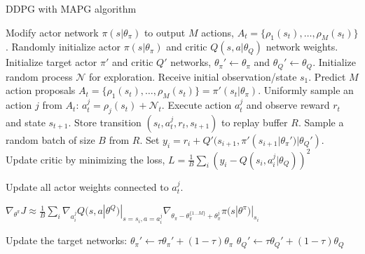 \begin{algorithm}[h]
  \caption{DDPG with MAPG algorithm}
  \label{alg:ddpgmap}
\begin{algorithmic}
  \STATE Modify actor network $\pi(s|\theta_\pi)$ to output $M$ actions,  $A_t = \{\rho_1(s_t), \ldots, \rho_M(s_t) \} $.
  \STATE Randomly initialize actor $\pi(s|\theta_\pi)$ and critic $Q(s, a|\theta_Q)$ network weights.
  \STATE Initialize target actor $\pi'$ and critic $Q'$ networks, $\theta_\pi' \gets \theta_\pi$ and $\theta_Q' \gets \theta_Q$.  
  \STATE Initialize random process $\mathcal{N}$ for exploration.
  \STATE Receive initial observation/state $s_1$.
  \STATE Predict $M$ action proposals $A_t = \{\rho_1(s_t), \ldots, \rho_M(s_t) \} = \pi'(s_t|\theta_\pi)$.
  \STATE Uniformly sample an action $j$ from $A_t$: $a^j_t = \rho_j(s_t) + \mathcal{N}_t$.
  \STATE Execute action $a^j_t$ and observe reward $r_t$ and state $s_{t+1}$.
  \STATE Store transition $(s_t, a^j_t, r_t, s_{t+1})$ to replay buffer $R$.
  \STATE Sample a random batch of size $B$ from $R$.
  \STATE Set $y_i = r_i + Q'(s_{i+1}, \pi'(s_{i+1}|\theta_\pi')|\theta_Q')$.
  \STATE Update critic by minimizing the loss, 
  \STATE \hspace{2em} $L = \frac{1}{B} \sum_{i} (y_i - Q(s_i, a^j_i|\theta_Q))^2$    

  \STATE Update all actor weights connected to $a^j_t$. %

   \STATE \hspace{2em} $\nabla_{\theta^\pi} J \approx \frac{1}{B} \sum_{i} \nabla_{a^j_i}Q(s, a| \theta^Q)|_{s=s_i, a=a^j_i} \nabla_{\theta_\pi - \theta_\pi^{\{1 \dots M\}}+ \theta_\pi^j} \pi(s|\theta^\pi)|_{s_i}$
   
  \STATE Update the target networks: 
  \STATE \hspace{2em} $\theta_\pi' \gets \tau\theta_\pi' + (1-\tau)\theta_\pi$
  \STATE \hspace{2em} $\theta_Q' \gets \tau\theta_Q' + (1-\tau)\theta_Q$
  \ENDFOR
  \ENDFOR
\end{algorithmic}
\end{algorithm}

